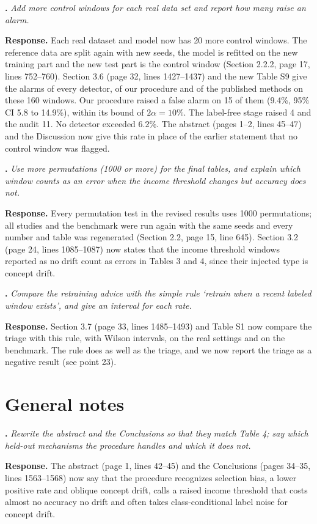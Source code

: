 \documentclass[11pt,a4paper]{article}
\newcounter{point}
\newcommand{\point}[1]{\par\medskip\stepcounter{point}\textbf{\thepoint. }\textit{#1}\par}
\newcommand{\reply}{\textbf{Response. }}
\begin{document}
\point{Add more control windows for each real data set and report how many raise an alarm.}
\reply Each real dataset and model now has 20 more control windows. The reference data are split again with new seeds, the model is refitted on the new training part and the new test part is the control window (Section 2.2.2, page 17, lines 752--760). Section 3.6 (page 32, lines 1427--1437) and the new Table S9 give the alarms of every detector, of our procedure and of the published methods on these 160 windows. Our procedure raised a false alarm on 15 of them (9.4\%, 95\% CI 5.8 to 14.9\%), within its bound of $2\alpha = 10\%$. The label-free stage raised 4 and the audit 11. No detector exceeded 6.2\%. The abstract (pages 1--2, lines 45--47) and the Discussion now give this rate in place of the earlier statement that no control window was flagged.

\point{Use more permutations (1000 or more) for the final tables, and explain which window counts as an error when the income threshold changes but accuracy does not.}
\reply Every permutation test in the revised results uses 1000 permutations; all studies and the benchmark were run again with the same seeds and every number and table was regenerated (Section 2.2, page 15, line 645). Section 3.2 (page 24, lines 1085--1087) now states that the income threshold windows reported as no drift count as errors in Tables 3 and 4, since their injected type is concept drift.

\point{Compare the retraining advice with the simple rule `retrain when a recent labeled window exists', and give an interval for each rate.}
\reply Section 3.7 (page 33, lines 1485--1493) and Table S1 now compare the triage with this rule, with Wilson intervals, on the real settings and on the benchmark. The rule does as well as the triage, and we now report the triage as a negative result (see point 23).

\section*{General notes}

\point{Rewrite the abstract and the Conclusions so that they match Table 4; say which held-out mechanisms the procedure handles and which it does not.}
\reply The abstract (page 1, lines 42--45) and the Conclusions (pages 34--35, lines 1563--1568) now say that the procedure recognizes selection bias, a lower positive rate and oblique concept drift, calls a raised income threshold that costs almost no accuracy no drift and often takes class-conditional label noise for concept drift.
\end{document}
